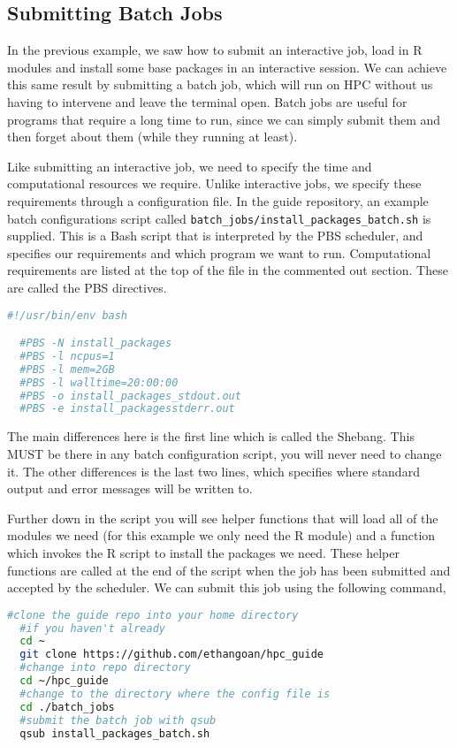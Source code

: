 \subsection{Submitting Batch Jobs}
In the previous example, we saw how to submit an interactive job, load in R modules and install some base packages in an interactive session. We can achieve this same result by submitting a batch job, which will run on HPC without us having to intervene and leave the terminal open. Batch jobs are useful for programs that require a long time to run, since we can simply submit them and then forget about them (while they running at least).
%
\par
% 
%
Like submitting an interactive job, we need to specify the time and computational resources we require. Unlike interactive jobs, we specify these requirements through a configuration file. In the guide repository, an example batch configurations script called \texttt{batch\_jobs/install\_packages\_batch.sh} is supplied. This is a Bash script that is interpreted by the PBS scheduler, and specifies our requirements and which program we want to run. Computational requirements are listed at the top of the file in the commented out section. These are called the PBS directives.
\begin{lstlisting}[language=bash, frame=single]
  #!/usr/bin/env bash

  #PBS -N install_packages
  #PBS -l ncpus=1
  #PBS -l mem=2GB
  #PBS -l walltime=20:00:00
  #PBS -o install_packages_stdout.out
  #PBS -e install_packagesstderr.out

\end{lstlisting}
%
%
The main differences here is the first line which is called the Shebang. This MUST be there in any batch configuration script, you will never need to change it. The other differences is the last two lines, which specifies where standard output and error messages will be written to.
%
%
\par
%
%
Further down in the script you will see helper functions that will load all of the modules we need (for this example we only need the R module) and a function which invokes the R script to install the packages we need. These helper functions are called at the end of the script when the job has been submitted and accepted by the scheduler. We can submit this job using the following command,
%
%
\newpage
\begin{lstlisting}[language=bash, frame=single]
  #clone the guide repo into your home directory
  #if you haven't already
  cd ~
  git clone https://github.com/ethangoan/hpc_guide
  #change into repo directory
  cd ~/hpc_guide
  #change to the directory where the config file is
  cd ./batch_jobs
  #submit the batch job with qsub
  qsub install_packages_batch.sh
\end{lstlisting}
